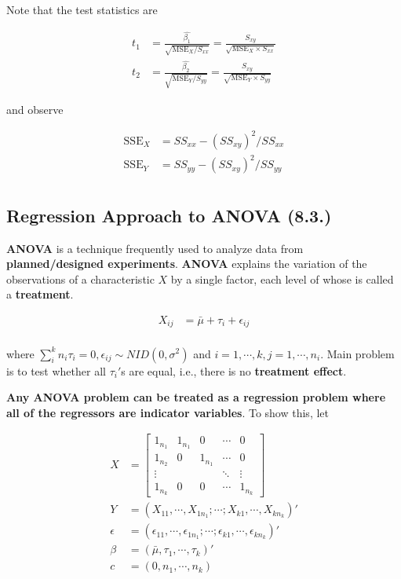 \documentclass[12pt]{article}
\begin{document}
Note that the test statistics are 

$$
\begin{aligned}	
t_1 &= \frac{\hat{\beta_1}}{\sqrt{\mathrm{MSE}_X/S_{xx}}} = \frac{S_{xy}}{\sqrt{\mathrm{MSE}_X \times S_{xx}}} \\[8pt]
t_2 &= \frac{\hat{\beta_2}}{\sqrt{\mathrm{MSE}_Y/S_{yy}}} = \frac{S_{xy}}{\sqrt{\mathrm{MSE}_Y \times S_{yy}}}
\end{aligned}
$$

and observe 

$$
\begin{aligned}
\mathrm{SSE}_X &= SS_{xx} - (SS_{xy})^2/SS_{xx} \\
\mathrm{SSE}_Y &= SS_{yy} - (SS_{xy})^2/SS_{yy} \\ 
\end{aligned}
$$


\subsection{Regression Approach to ANOVA (8.3.)}

\textbf{ANOVA} is a technique frequently used to analyze data from \textbf{planned/designed experiments}. \textbf{ANOVA} explains the variation of the observations of a characteristic $X$ by a single factor, each level of whose is called a \textbf{treatment}. 

$$
\begin{aligned}
X_{ij} &= \bar{\mu} + \tau_i + \epsilon_{ij} \\[10pt]
\end{aligned}
$$

where $\sum_i^k n_i \tau_i = 0, \epsilon_{ij} \sim NID(0, \sigma^2)$ and $i = 1, \cdots, k, j=1, \cdots, n_i$. Main problem is to test whether all $\tau_i'$s are equal, i.e., there is no \textbf{treatment effect}.

\textbf{Any ANOVA problem can be treated as a regression problem where all of the regressors are indicator variables}. To show this, let

$$
\begin{aligned}
X &= \begin{bmatrix} 1_{n_1} & 1_{n_1} & 0 & \cdots & 0 \\
					 1_{n_2} & 0 & 1_{n_1} & \cdots & 0 \\ 
					 \vdots  &   &         & \ddots & \vdots \\
					 1_{n_k} & 0 & 0       & \cdots & 1_{n_k} \end{bmatrix} \\[10pt]
Y &= \left(X_{11}, \cdots, X_{1n_1}; \cdots; X_{k1}, \cdots, X_{kn_k} \right)' \\[8pt]
\epsilon &= \left( \epsilon_{11}, \cdots, \epsilon_{1n_1}; \cdots; \epsilon_{k1}, \cdots, \epsilon_{kn_k} \right)' \\[8pt]
\beta &= \left( \bar{\mu}, \tau_1, \cdots, \tau_k \right)' \\[8pt]
c &= \left( 0, n_1, \cdots, n_k\right)
\end{aligned}
$$
\end{document}
